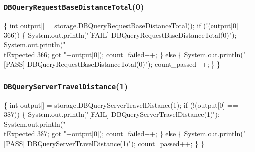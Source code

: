 \documentclass{article}
\def\nwendcode{\endtrivlist \endgroup}
\let\nwdocspar=\par
\begin{document}
\subsubsection{{\tt{}DBQueryRequestBaseDistanceTotal}(0)}
\nwenddocs{}\endmoddef{}
\{
  int output[] = storage.DBQueryRequestBaseDistanceTotal();
  if (!(output[0] == 366)) \{
    System.out.println("[FAIL] DBQueryRequestBaseDistanceTotal(0)");
    System.out.println("\\tExpected 366; got "+output[0]);
    count_failed++;
  \} else \{
    System.out.println("[PASS] DBQueryRequestBaseDistanceTotal(0)");
    count_passed++;
  \}
\}
\nwendcode{}\nwdocspar
\subsubsection{{\tt{}DBQueryServerTravelDistance}(1)}
\nwenddocs{}\endmoddef{}
\{
  int output[] = storage.DBQueryServerTravelDistance(1);
  if (!(output[0] == 387)) \{
    System.out.println("[FAIL] DBQueryServerTravelDistance(1)");
    System.out.println("\\tExpected 387; got "+output[0]);
    count_failed++;
  \} else \{
    System.out.println("[PASS] DBQueryServerTravelDistance(1)");
    count_passed++;
  \}
\}
\nwendcode{}\nwdocspar
\end{document}
